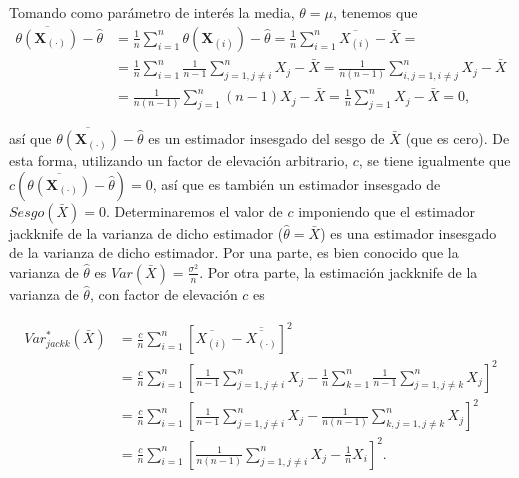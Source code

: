 \documentclass[]{book}
\theoremstyle{definition}
\theoremstyle{definition}
\theoremstyle{definition}
\theoremstyle{remark}
\begin{document}
Tomando como parámetro de interés la media, \(\theta =\mu\), tenemos que
\[\begin{aligned}
\overline{\theta \left( \mathbf{X}_{(\cdot)} \right)}-
\hat{\theta} &= \frac{1}{n}\sum_{i=1}^{n}\theta \left( 
\mathbf{X}_{(i)} \right) -\hat{\theta}=\frac{1}{n}\sum_{i=1}^{n}
\overline{X_{(i)}}-\bar{X}= \\
&= \frac{1}{n}\sum_{i=1}^{n}\frac{1}{n-1}\sum_{j=1,j\neq i}^{n}X_j-
\bar{X}=\frac{1}{n\left( n-1 \right)}\sum_{i,j=1,i\neq j}^{n}X_j-
\bar{X} \\
&= \frac{1}{n\left( n-1 \right)}\sum_{j=1}^{n}\left( n-1 \right) X_j-
\bar{X}=\frac{1}{n}\sum_{j=1}^{n}X_j-\bar{X}=0,\end{aligned}\]

así que
\(\overline{\theta \left( \mathbf{X}_{(\cdot)} \right)}-\hat{\theta}\)
es un estimador insesgado del sesgo de \(\bar{X}\) (que es cero). De
esta forma, utilizando un factor de elevación arbitrario, \(c\), se
tiene igualmente que
\(c\left( \overline{\theta \left( \mathbf{X}_{(\cdot)} \right)}-\hat{\theta}  \right) =0\),
así que es también un estimador insesgado de
\(Sesgo\left( \bar{X} \right) =0\). Determinaremos el valor de \(c\)
imponiendo que el estimador jackknife de la varianza de dicho estimador
(\(\hat{\theta}=\bar{X}\)) es una estimador insesgado de la varianza de
dicho estimador. Por una parte, es bien conocido que la varianza de
\(\hat{\theta}\) es \(Var\left( \bar{X} \right) =\frac{\sigma^2}{n}\).
Por otra parte, la estimación jackknife de la varianza de
\(\hat{\theta}\), con factor de elevación \(c\) es

\[\begin{aligned}
Var_{jackk}^{\ast}\left( \bar{X} \right) &= \frac{c}{n}\sum_{i=1}^{n}
\left[ \overline{X_{(i)}}-\overline{\overline{X_{\left( \cdot
 \right)}}}\right]^2 \\
&= \frac{c}{n}\sum_{i=1}^{n}\left[ \frac{1}{n-1}\sum_{j=1,j\neq i}^{n}X_j-
\frac{1}{n}\sum_{k=1}^{n}\frac{1}{n-1}\sum_{j=1,j\neq k}^{n}X_j\right]^2
\\
&= \frac{c}{n}\sum_{i=1}^{n}\left[ \frac{1}{n-1}\sum_{j=1,j\neq i}^{n}X_j-
\frac{1}{n\left( n-1 \right)}\sum_{k,j=1,j\neq k}^{n}X_j\right]^2 \\
&= \frac{c}{n}\sum_{i=1}^{n}\left[ \frac{1}{n\left( n-1 \right)}
\sum_{j=1,j\neq i}^{n}X_j-\frac{1}{n}X_i\right]^2.\end{aligned}\]
\end{document}
